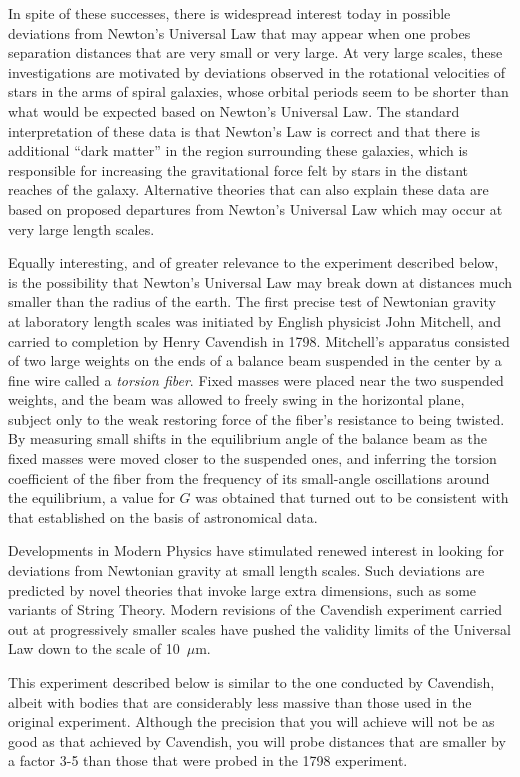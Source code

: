 \documentclass{revtex4}
\begin{document}
In spite of these successes, there is widespread interest today in possible
deviations from Newton's Universal Law that may appear when one probes
separation distances that are very small or very large.  At very large
scales, these investigations are motivated by deviations observed in the
rotational velocities of stars in the arms of spiral galaxies, whose
orbital periods seem to be shorter than what would be expected based on
Newton's Universal Law.  The standard interpretation of these data is that
Newton's Law is correct and that there is additional ``dark matter'' in the
region surrounding these galaxies, which is responsible for increasing the
gravitational force felt by stars in the distant reaches of the galaxy.
Alternative theories that can also explain these data are based on  proposed
departures from Newton's Universal Law which may occur at very large length
scales.

Equally interesting, and of greater relevance to the experiment described
below, is the possibility that Newton's Universal Law may break down at
distances much smaller than the radius of the earth.  The first precise
test of Newtonian gravity at laboratory length scales was initiated by
English physicist John Mitchell, and carried to completion by Henry
Cavendish in 1798.  Mitchell's apparatus consisted of two large weights on
the ends of a balance beam suspended in the center by a fine wire called
a {\em torsion fiber}.  Fixed
masses were placed near the two suspended weights, and the beam was allowed
to freely swing in the horizontal plane, subject only to the weak restoring
force of the fiber's resistance to being twisted.  By measuring small shifts
in the equilibrium angle of the balance beam as the fixed masses were moved
closer to the suspended ones, and inferring the torsion coefficient of the
fiber from the frequency of its small-angle oscillations around the 
equilibrium, a value for $G$ was obtained that turned out to be consistent
with that established on the basis of astronomical data.

Developments in Modern Physics have stimulated renewed interest in looking
for deviations from Newtonian gravity at small length scales.  Such deviations
are predicted by novel theories that invoke large extra dimensions, such
as some variants of String Theory.  Modern revisions of the Cavendish
experiment carried out at progressively smaller scales have pushed the
validity limits of the Universal Law down to the scale of 10~$\mu$m.

This experiment described below is similar to the one conducted by
Cavendish, albeit with bodies that are considerably less massive than
those used in the original experiment.  Although the precision that you
will achieve will not be as good as that achieved by Cavendish, you will
probe distances that are smaller by a factor 3-5 than those that were
probed in the 1798 experiment.
\end{document}
